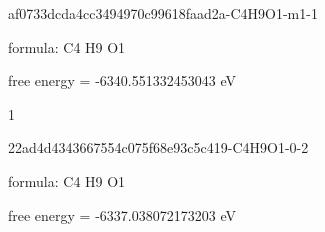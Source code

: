 \documentclass{article}
\begin{document}
\vspace{1cm}


af0733dcda4cc3494970c99618faad2a-C4H9O1-m1-1



formula: C4 H9 O1



free energy = -6340.551332453043 eV

1

\vspace{1cm}


22ad4d4343667554c075f68e93c5c419-C4H9O1-0-2



formula: C4 H9 O1



free energy = -6337.038072173203 eV
\end{document}
